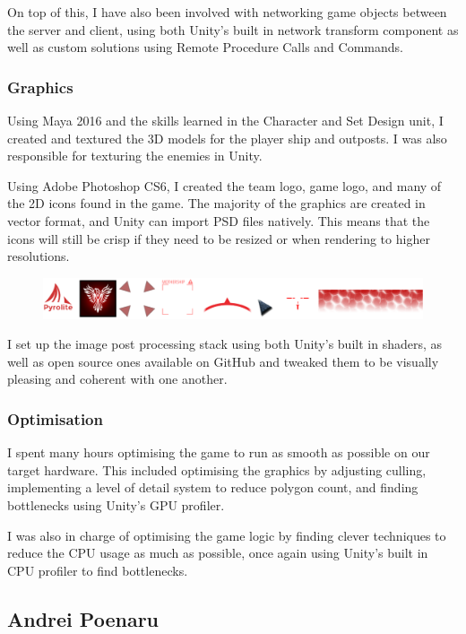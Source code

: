\documentclass[a4paper,11pt]{article}
\begin{document}
On top of this, I have also been involved with networking game objects between the server and client, using both Unity’s built in network transform component as well as custom solutions using Remote Procedure Calls and Commands.

\subsubsection{Graphics}
Using Maya 2016 and the skills learned in the Character and Set Design unit, I created and textured the 3D models for the player ship and outposts. I was also responsible for texturing the enemies in Unity. 

Using Adobe Photoshop CS6, I created the team logo, game logo, and many of the 2D icons found in the game. The majority of the graphics are created in vector format, and Unity can import PSD files natively. This means that the icons will still be crisp if they need to be resized or when rendering to higher resolutions.

\begin{figure}[ht]
	\centering
	\includegraphics[width=\textwidth]{images/2dArt}
\end{figure}

I set up the image post processing stack using both Unity’s built in shaders, as well as open source ones available on GitHub and tweaked them to be visually pleasing and coherent with one another.

\subsubsection{Optimisation}
I spent many hours optimising the game to run as smooth as possible on our target hardware. This included optimising the graphics by adjusting culling, implementing a level of detail system to reduce polygon count, and finding bottlenecks using Unity’s GPU profiler.

I was also in charge of optimising the game logic by finding clever techniques to reduce the CPU usage as much as possible, once again using Unity’s built in CPU profiler to find bottlenecks.

\clearpage

\subsection{Andrei Poenaru}
\end{document}
